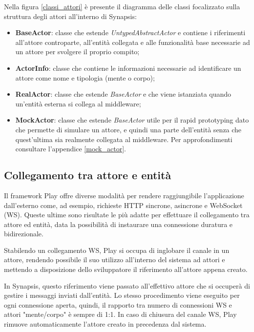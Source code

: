 Nella figura \ref{classi_attori} è presente il diagramma delle classi focalizzato sulla struttura degli attori all'interno di Synapsis:
\begin{itemize}
    \item \textbf{BaseActor}: classe che estende \textit{UntypedAbstractActor} e contiene i riferimenti all'attore controparte, all'entità collegata e alle funzionalità base necessarie ad un attore per svolgere il proprio compito;
    \item \textbf{ActorInfo}: classe che contiene le informazioni necessarie ad identificare un attore come nome e tipologia (mente o corpo);
    \item \textbf{RealActor}: classe che estende \textit{BaseActor} e che viene istanziata quando un'entità esterna si collega al middleware;
    \item \textbf{MockActor}: classe che estende \textit{BaseActor} utile per il rapid prototyping dato che permette di simulare un attore, e quindi una parte dell'entità senza che quest'ultima sia realmente collegata al middleware. Per approfondimenti consultare l'appendice \ref{mock_actor}.
\end{itemize}

\subsection{Collegamento tra attore e entità}

Il framework Play offre diverse modalità per rendere raggiungibile l'applicazione dall'esterno come, ad esempio, richieste HTTP sincrone, asincrone e WebSocket (WS). Queste ultime sono risultate le più adatte per effettuare il collegamento tra attore ed entità, data la possibilità di instaurare una connessione duratura e bidirezionale.

\medskip

Stabilendo un collegamento WS, Play si occupa di inglobare il canale in un attore, rendendo possibile il suo utilizzo all'interno del sistema ad attori e mettendo a disposizione dello sviluppatore il riferimento all'attore appena creato. 

\medskip

In Synapsis, questo riferimento viene passato all'effettivo attore che si occuperà di gestire i messaggi inviati dall'entità. Lo stesso procedimento viene eseguito per ogni connessione aperta, quindi, il rapporto tra numero di connessioni WS e attori "mente/corpo" è sempre di 1:1. In caso di chiusura del canale WS, Play rimuove automaticamente l'attore creato in precedenza dal sistema.

